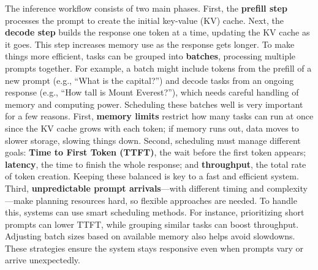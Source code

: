 The inference workflow consists of two main phases. First, the \textbf{prefill step} processes the prompt to create the initial key-value (KV) cache.  
Next, the \textbf{decode step} builds the response one token at a time, updating the KV cache as it goes. This step increases memory use as the response gets longer. To make things more efficient, tasks can be grouped into \textbf{batches}, processing multiple prompts together. For example, a batch might include tokens from the prefill of a new prompt (e.g., ``What is the capital?'') and decode tasks from an ongoing response (e.g., ``How tall is Mount Everest?''), which needs careful handling of memory and computing power. Scheduling these batches well is very important for a few reasons. First, \textbf{memory limits} restrict how many tasks can run at once since the KV cache grows with each token; if memory runs out, data moves to slower storage, slowing things down. Second, scheduling must manage different goals: \textbf{Time to First Token (TTFT)}, the wait before the first token appears; \textbf{latency}, the time to finish the whole response; and \textbf{throughput}, the total rate of token creation. Keeping these balanced is key to a fast and efficient system. Third, \textbf{unpredictable prompt arrivals}---with different timing and complexity---make planning resources hard, so flexible approaches are needed.  
To handle this, systems can use smart scheduling methods. For instance, prioritizing short prompts can lower TTFT, while grouping similar tasks can boost throughput. Adjusting batch sizes based on available memory also helps avoid slowdowns. These strategies ensure the system stays responsive even when prompts vary or arrive unexpectedly.

